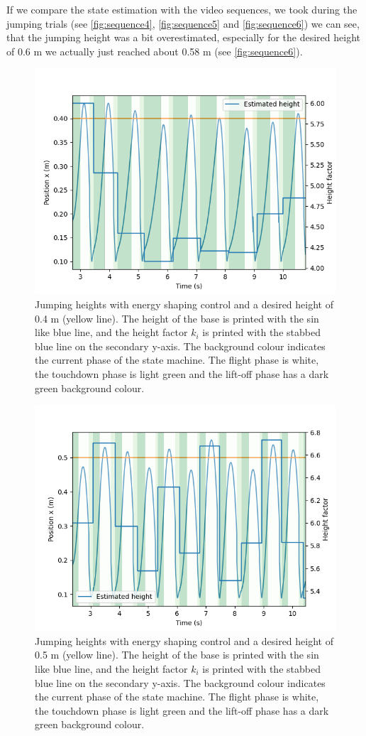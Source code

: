\documentclass[onecolumn, letter paper]{report}
\begin{document}
If we compare the state estimation with the video sequences, we took during the jumping trials (see \autoref{fig:sequence4}, \ref{fig:sequence5} and \ref{fig:sequence6}) we can see, that the jumping height was a bit overestimated, especially for the desired height of 0.6 m we actually just reached about 0.58 m (see \autoref{fig:sequence6}).
\begin{figure}[htb!]
    \centering
    \includegraphics[width=.6\textwidth]{figures/0.4m/height.png}
    \caption{Jumping heights with energy shaping control and a desired height of 0.4 m (yellow line). The height of the base is printed with the sin like blue line, and the height factor $k_i$ is printed with the stabbed blue line on the secondary y-axis. The background colour indicates the current phase of the state machine. The flight phase is white, the touchdown phase is light green and the lift-off phase has a dark green background colour.}
    \label{fig:4height}
\end{figure}
\begin{figure}[htb!]
    \centering
    \includegraphics[width=.6\textwidth]{figures/0.5m/height.png}
    \caption{Jumping heights with energy shaping control and a desired height of 0.5 m (yellow line). The height of the base is printed with the sin like blue line, and the height factor $k_i$ is printed with the stabbed blue line on the secondary y-axis. The background colour indicates the current phase of the state machine. The flight phase is white, the touchdown phase is light green and the lift-off phase has a dark green background colour.}
    \label{fig:5height}
\end{figure}
\end{document}

